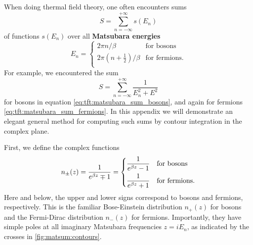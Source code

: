 When doing thermal field theory, one often encounters sums
\begin{equation}
	S = \sum_{n=-\infty}^{+\infty} s(E_n)
\label{eq:matsum:sum}
\end{equation}
of functions $s(E_n)$ over all \textbf{Matsubara energies}
\begin{equation}
	E_n = \begin{cases}
	          2 \pi n / \beta                        & \text{for bosons}    \\
	          2 \pi \left( n+\frac12 \right) / \beta & \text{for fermions} .\\
	      \end{cases}
\end{equation}
For example, we encountered the sum
\begin{equation}
	S = \sum_{n=-\infty}^{+\infty} \frac{1}{E_n^2 + E^2}
\label{eq:matsum:motivating_example}
\end{equation}
for bosons in equation \eqref{eq:tft:matsubara_sum_bosons}, and again for fermions \eqref{eq:tft:matsubara_sum_fermions}.
In this appendix we will demonstrate an elegant general method for computing such sums by contour integration in the complex plane.

First, we define the complex functions
\begin{equation}
	n_\pm(z) = \frac{1}{e^{\beta z} \mp 1}
	         = \begin{dcases}
		           \displaystyle \frac{1}{e^{\beta z} - 1} & \text{for bosons}     \\
		           \displaystyle \frac{1}{e^{\beta z} + 1} & \text{for fermions} . \\
	           \end{dcases}
\label{eq:matsum:distribution}
\end{equation}
Here and below, the upper and lower signs correspond to bosons and fermions, respectively.
This is the familiar Bose-Einstein distribution $n_+(z)$ for bosons and the Fermi-Dirac distribution $n_-(z)$ for fermions.
Importantly, they have simple poles at all imaginary Matsubara frequencies $z = i E_n$, as indicated by the crosses in \cref{fig:matsum:contours}.


